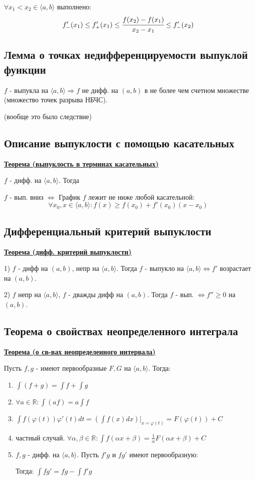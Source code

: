 \documentclass{article}
\newcommand{\dint}{\displaystyle \int}
\newcommand{\thmm}[1]{\underline{\textbf{#1}}}
\begin{document}
$\forall x_1<x_2\in \langle a,b\rangle$ выполнено:
$$f'_-(x_1)\leq f'_+(x_1) \leq \cfrac{f(x_2)-f(x_1)}{x_2-x_1}\leq f'_-(x_2)$$

\subsection{Лемма о точках недифференцируемости выпуклой функции}

$f$ - выпукла на $\langle a,b\rangle \Rightarrow f$ не дифф. на $(a,b)$ в не более чем счетном множестве (множество точек разрыва НБЧС). 

(вообще это было следствие)


\subsection{Описание выпуклости с помощью касательных}

\thmm{Теорема (выпуклость в терминах касательных)}

$f$ - дифф. на $\langle a,b \rangle$. Тогда

$f$ - вып. вниз $\Leftrightarrow$ График $f$ лежит не ниже любой касательной:
$$\forall x_0,x \in \langle a,b\rangle: f(x) \geq f(x_0) + f'(x_0)(x-x_0)$$

\subsection{Дифференциальный критерий выпуклости}

\thmm{Теорема (дифф. критерий выпуклости)}

1) $f$ - дифф на $(a,b)$, непр на $\langle a,b \rangle$. Тогда $f$ - выпукло на $\langle a,b\rangle \Leftrightarrow f'$ возрастает на $(a,b)$.

2) $f$ непр на $\langle a,b \rangle$, $f$ - дважды дифф на $(a,b)$. Тогда $f$ - вып. $\Leftrightarrow f''\geq 0$ на $(a,b)$.

\subsection{Теорема о свойствах неопределенного интеграла}

\thmm{Теорема (о св-вах неопределенного интервала)}

Пусть $f,g$ - имеют первообразные $F,G$ на $\langle a,b \rangle$. Тогда:

\begin{enumerate}
    \item $\dint (f+g) = \dint f + \dint g$
    \item $\forall a \in \mathbb{R}: \dint (af)=a\dint f$
    \item $\dint f(\varphi(t))\varphi'(t)dt = \left(\dint f(x)dx\right)\Big |_{x=\varphi(t)}= F(\varphi(t)) + C$
    \item частный случай. $\forall \alpha,\beta \in \mathbb{R}:\dint f(\alpha x + \beta) = \frac{1}{\alpha}F(\alpha x+\beta) + C$
    \item $f,g$ - дифф. на $\langle a,b\rangle$. Пусть $f'g$ и $fg'$ имеют первообразную: 
    
    Тогда: $\dint f g' = fg -\dint f'g$
\end{enumerate}
\end{document}
